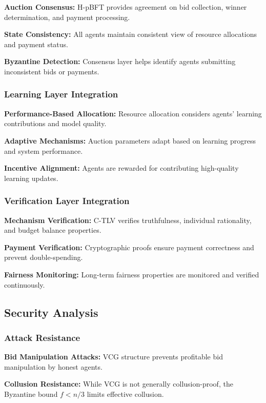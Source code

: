 \documentclass[conference]{IEEEtran}
\begin{document}
\textbf{Auction Consensus:} H-pBFT provides agreement on bid collection, winner determination, and payment processing.

\textbf{State Consistency:} All agents maintain consistent view of resource allocations and payment status.

\textbf{Byzantine Detection:} Consensus layer helps identify agents submitting inconsistent bids or payments.

\subsubsection{Learning Layer Integration}

\textbf{Performance-Based Allocation:} Resource allocation considers agents' learning contributions and model quality.

\textbf{Adaptive Mechanisms:} Auction parameters adapt based on learning progress and system performance.

\textbf{Incentive Alignment:} Agents are rewarded for contributing high-quality learning updates.

\subsubsection{Verification Layer Integration}

\textbf{Mechanism Verification:} C-TLV verifies truthfulness, individual rationality, and budget balance properties.

\textbf{Payment Verification:} Cryptographic proofs ensure payment correctness and prevent double-spending.

\textbf{Fairness Monitoring:} Long-term fairness properties are monitored and verified continuously.

\subsection{Security Analysis}

\subsubsection{Attack Resistance}

\textbf{Bid Manipulation Attacks:} VCG structure prevents profitable bid manipulation by honest agents.

\textbf{Collusion Resistance:} While VCG is not generally collusion-proof, the Byzantine bound $f < n/3$ limits effective collusion.
\end{document}
